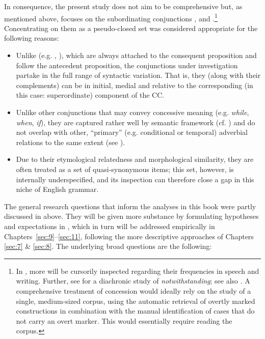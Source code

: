 In consequence, the present study does not aim to be comprehensive but, as mentioned above, focuses on the subordinating conjunctions ,  and .\footnote{In , more  will be cursorily inspected regarding their frequencies in speech and writing. Further, see \citet{Schützler2018a} for a diachronic study of \textit{notwithstanding}; see also \citet{Schützler2018c}. A comprehensive treatment of concession would ideally rely on the study of a single, medium-sized corpus, using the automatic retrieval of overtly marked constructions in combination with the manual identification of cases that do not carry an overt marker. This would essentially require reading the corpus.} Concentrating on them as a pseudo-closed set was considered appropriate for the following reasons:

\begin{itemize}
\item Unlike  (e.g. , ), which are always attached to the consequent proposition and follow the antecedent proposition, the conjunctions under investigation partake in the full range of syntactic variation. That is, they (along with their complements) can be in initial, medial and  relative to the corresponding (in this case: superordinate) component of the CC.
\item\sloppy Unlike other conjunctions that may convey concessive meaning (e.g. \textit{while}, \textit{when}, \textit{if}), they are captured rather well by  semantic framework (cf. ) and do not overlap with other, “primary” (e.g. conditional or temporal) adverbial relations to the same extent (see ).
\item Due to their etymological relatedness and morphological similarity, they are often treated as a set of quasi-synonymous items; this set, however, is internally underspecified, and its inspection can therefore close a gap in this niche of English grammar.
\end{itemize}

The general research questions that inform the analyses in this book were partly discussed in  above. They will be given more substance by formulating hypotheses and expectations in , which in turn will be addressed empirically in Chapters~\ref{sec:9}–\ref{sec:11}, following the more descriptive approaches of Chapters \ref{sec:7} \& \ref{sec:8}. The underlying broad questions are the following:

